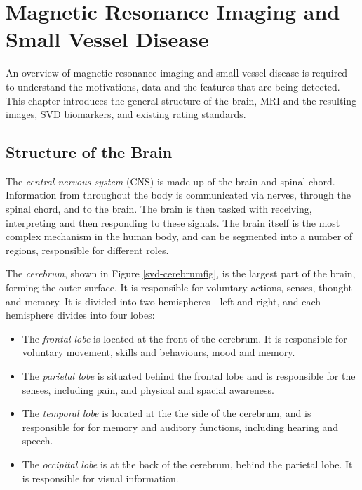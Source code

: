 




\chapter{Magnetic Resonance Imaging and Small Vessel Disease}\label{mri_svd_intro}

An overview of magnetic resonance imaging and small vessel disease is required to understand the motivations, data and the features that are being detected. This chapter introduces the general structure of the brain, MRI and the resulting images, SVD biomarkers, and existing rating standards.

\section{Structure of the Brain}\label{svd-brain}

The \textit{central nervous system} (CNS) is made up of the brain and spinal chord. Information from throughout the body is communicated via nerves, through the spinal chord, and to the brain. The brain is then tasked with receiving, interpreting and then responding to these signals. The brain itself is the most complex mechanism in the human body, and can be segmented into a number of regions, responsible for different roles. 

The \textit{cerebrum}, shown in Figure \ref{svd-cerebrumfig}, is the largest part of the brain, forming the outer surface. It is responsible for voluntary actions, senses, thought and memory. It is divided into two hemispheres - left and right, and each hemisphere divides into four lobes:
 \begin{itemize}
	\item The \textit{frontal lobe} is located at the front of the cerebrum. It is responsible for voluntary movement, skills and behaviours, mood and memory.
	\item The \textit{parietal lobe} is situated behind the frontal lobe and is responsible for the senses, including pain, and physical and spacial awareness.
	\item The \textit{temporal lobe} is located at the the side of the cerebrum, and is responsible for for memory and auditory functions, including hearing and speech.
	\item The \textit{occipital lobe} is at the back of the cerebrum, behind the parietal lobe. It is responsible for visual information.
\end{itemize}

